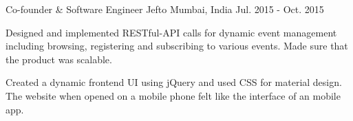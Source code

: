 

\begin{cventries}
  
  \cventry
    {Co-founder \& Software Engineer} %
    {Jefto} %
    {Mumbai, India} %
    {Jul. 2015 - Oct. 2015} %
    {
      \begin{cvitems} %
        \item {Designed and implemented RESTful-API calls for dynamic event management including browsing, registering and subscribing to various events. Made sure that the product was scalable. }
        \item {Created a dynamic frontend UI using jQuery and used CSS for material design. The website when opened on a mobile phone felt like the interface of an mobile app.}
      \end{cvitems}
    }

\end{cventries}






